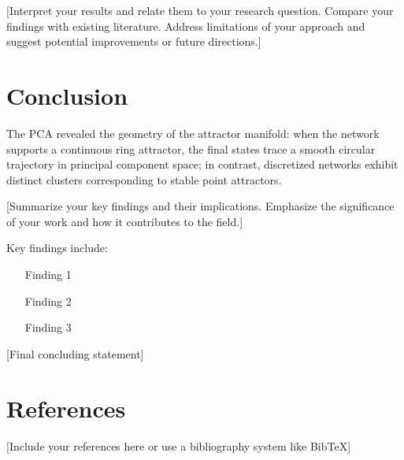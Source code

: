 \documentclass[11pt,a4paper]{article}
\begin{document}
[Interpret your results and relate them to your research question. Compare your findings with existing literature. Address limitations of your approach and suggest potential improvements or future directions.]

\section*{Conclusion}

The PCA revealed the geometry of the attractor manifold: when the network supports a continuous ring attractor, the final states trace a smooth circular trajectory in principal component space; in contrast, discretized networks exhibit distinct clusters corresponding to stable point attractors. 


[Summarize your key findings and their implications. Emphasize the significance of your work and how it contributes to the field.]

Key findings include:
\begin{itemize}
\item [Finding 1]
\item [Finding 2]
\item [Finding 3]
\end{itemize}

[Final concluding statement]

\section*{References}

[Include your references here or use a bibliography system like BibTeX]
\end{document}
